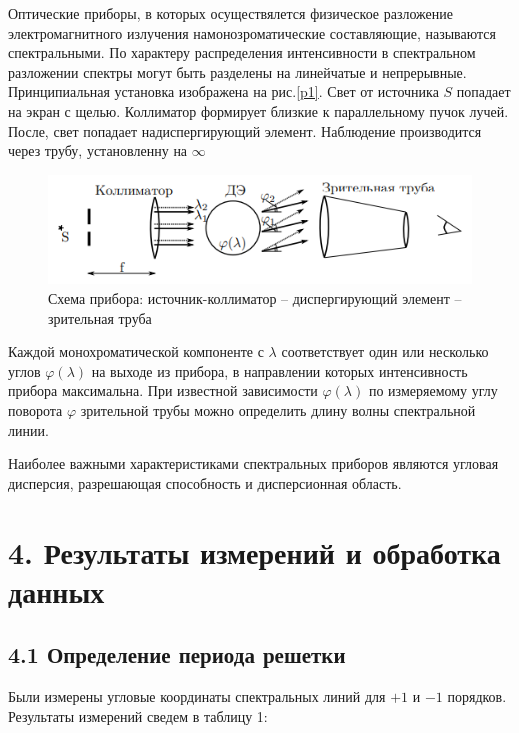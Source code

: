 \documentclass[a4paper,12pt]{report}
\begin{document}
Оптические приборы, в которых осуществялется физическое разложение электромагнитного излучения намонозроматические составляющие, называются спектральными. По характеру распределения интенсивности в спектральном разложении спектры могут быть разделены на линейчатые и непрерывные.  
Принципиальная установка изображена на рис.\ref{p1}. Свет от источника $S$ попадает на экран с щелью. Коллиматор формирует близкие к параллельному пучок лучей. После, свет попадает надиспергирующий элемент. Наблюдение производится через трубу, установленну на $\infty$

\begin{figure}[H]
    \begin{center}
        \includegraphics[scale = 1]{pic2.PNG}
        \caption{Схема прибора: источник-коллиматор – диспергирующий элемент – зрительная труба}
    \end{center}
\end{figure}

Каждой монохроматической компоненте с $\lambda$ соответствует один или несколько углов $\varphi(\lambda)$ на выходе из прибора, в направлении которых интенсивность прибора максимальна. При известной зависимости $\varphi(\lambda)$ по измеряемому углу поворота $\varphi$ зрительной трубы можно определить длину волны спектральной линии.  

Наиболее важными характеристиками спектральных приборов являются угловая дисперсия, разрешающая способность и дисперсионная область.
\section*{4. Результаты измерений и обработка данных}

\subsection*{4.1 Определение периода решетки}

Были измерены угловые координаты спектральных линий для $+1$ и $-1$ порядков. Результаты измерений сведем в таблицу 1:
\end{document}
